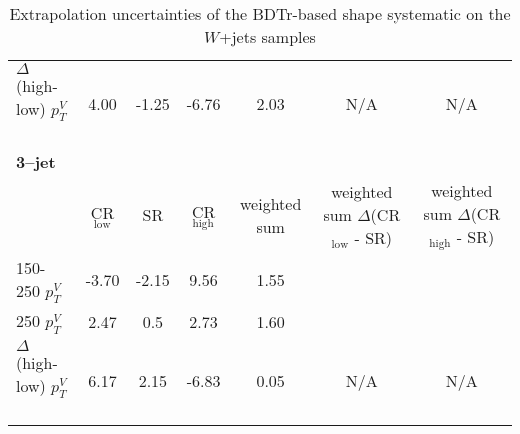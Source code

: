 \begin{table}[!htb]
{\begin{tabular}{lS[table-format=3.2]S[table-format=3.2]S[table-format=3.2]S[table-format=3.2]S[table-format=3.2]S[table-format=3.2]}
      $\Delta$(high-low) $p_T^V$\   & 4.00    & -1.25 & -6.76 & 2.03 &  N/A        &   N/A  \\
      {\bfseries 3--jet} & & & & & & \\
      & CR$_{\text{low}}$ & SR &  CR$_{\text{high}}$ & {weighted sum} &   {weighted sum $\Delta$(CR$_{\text{low}}$ - SR)}  & {weighted sum $\Delta$(CR$_{\text{high}}$ - SR)}         \\
      150-250 $p_T^V$\              & -3.70  & -2.15 & 9.56  & 1.55 &    {} & {} \\
      250 $p_T^V$\                  &  2.47  & 0.5\footnotemark[1]  & 2.73  & 1.60 &        &        \\
      $\Delta$(high-low) $p_T^V$\   &  6.17  & 2.15  & -6.83 & 0.05 &   N/A      &    N/A  \\
      \bottomrule
    \end{tabular}
  }
  \caption{Extrapolation uncertainties of the BDTr-based shape systematic on the
    $W$+jets samples}
  \label{tab:wjets-extrapolation_uncertainties_BDTr}
\end{table}